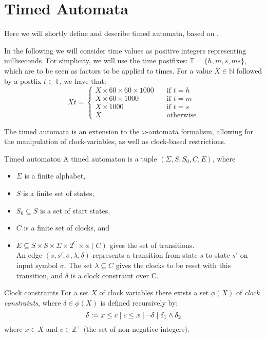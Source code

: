
\section{Timed Automata}
Here we will shortly define and describe timed automata, based on \cite{timed_automata}.

In the following we will consider time values as positive integers representing milliseconds.
For simplicity, we will use the time postfixes: $\mathbb{T} = \{ h, m, s, ms \}$, which are to be seen as factors to be applied to times.
For a value $X \in \mathbb{N}$ followed by a postfix $t \in \mathbb{T}$, we have that:
\[Xt = \begin{cases}
  X \times 60 \times 60 \times 1000 & \quad\text{if } t = h \\
  X \times 60 \times 1000 & \quad\text{if } t = m \\
  X \times 1000 & \quad\text{if } t = s \\
  X & \quad\text{otherwise}
\end{cases}\]

The timed automata is an extension to the $\omega$-automata formalism, allowing for the manipulation of clock-variables, as well as clock-based restrictions.

\begin{definition}{Timed automaton}
A timed automaton is a tuple $(\Sigma, S, S_0, C, E)$, where
\begin{itemize}
  \item $\Sigma$ is a finite alphabet,
  \item $S$ is a finite set of states,
  \item $S_0 \subseteq S$ is a set of start states,
  \item $C$ is a finite set of clocks, and
  \item $E \subseteq S \times S \times \Sigma \times 2^C \times \phi(C)$ gives the set of transitions. \\
    An edge $(s, s', \sigma, \lambda, \delta)$ represents a transition from state $s$ to state $s'$ on input symbol $\sigma$.
    The set $\lambda \subseteq C$ gives the clocks to be reset with this transition, and $\delta$ is a clock constraint over C.
\end{itemize}
\end{definition}

\begin{definition}{Clock constraints}
For a set $X$ of clock variables there exists a set $\phi(X)$ of \emph{clock constraints}, where $\delta \in \phi(X)$ is defined recursively by:
\[ \delta := x \leq c \; | \; c \leq x \; | \; \lnot \delta \; | \; \delta_1 \land \delta_2 \]
where $x \in X$ and $c \in \mathbb{Z}^+$ (the set of non-negative integers).
\end{definition}

